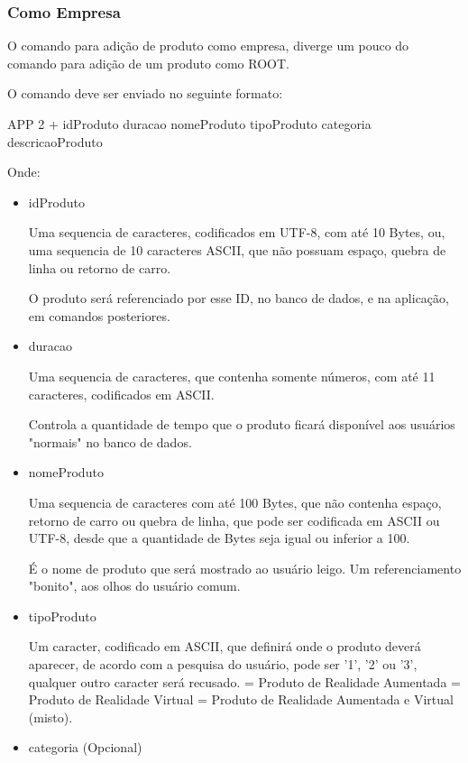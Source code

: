 \documentclass{article}
\begin{document}
			\subsubsection{Como Empresa}\indent
				\par O comando para adição de produto como empresa, diverge um pouco do comando para adição de um produto como ROOT.
				\par O comando deve ser enviado no seguinte formato:
				\begin{center}
					APP 2 + idProduto duracao nomeProduto tipoProduto categoria descricaoProduto
				\end{center}
				\par Onde:
				\begin{itemize}
					\item{idProduto}
						\par Uma sequencia de caracteres, codificados em UTF-8, com até 10 Bytes, ou, uma sequencia de 10 caracteres ASCII, que não possuam espaço, quebra de linha ou retorno de carro.
						\par O produto será referenciado por esse ID, no banco de dados, e na aplicação, em comandos posteriores.
					\item{duracao}
						\par Uma sequencia de caracteres, que contenha somente números, com até 11 caracteres, codificados em ASCII.
						\par Controla a quantidade de tempo que o produto ficará disponível aos usuários "normais" no banco de dados.
					\item{nomeProduto}
						\par Uma sequencia de caracteres com até 100 Bytes, que não contenha espaço, retorno de carro ou quebra de linha, que pode ser codificada em ASCII ou UTF-8, desde que a quantidade de Bytes seja igual ou inferior a 100.
						\par É o nome de produto que será mostrado ao usuário leigo. Um referenciamento "bonito", aos olhos do usuário comum.
					\item{tipoProduto}
						\par Um caracter, codificado em ASCII, que definirá onde o produto deverá aparecer, de acordo com a pesquisa do usuário, pode ser '1', '2' ou '3', qualquer outro caracter será recusado.
						 = Produto de Realidade Aumentada
						 = Produto de Realidade Virtual
						 = Produto de Realidade Aumentada e Virtual (misto).
					\item{categoria} (Opcional)

\end{itemize}
\end{document}
